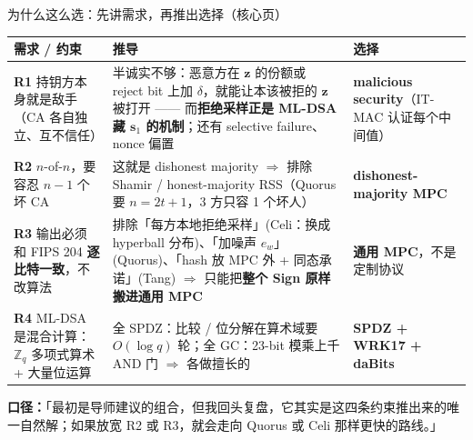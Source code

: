 \documentclass[aspectratio=169,10pt,fontset=none]{ctexbeamer}
\newcommand{\say}[1]{{\color{ok}\textbf{口径：}}#1}
\begin{document}
\begin{frame}{为什么这么选：先讲需求，再推出选择（核心页）}
\renewcommand{\arraystretch}{1.25}
\begin{tabularx}{\textwidth}{@{}p{3.6cm}Y p{3.3cm}@{}}
\toprule
\textbf{需求 / 约束} & \textbf{推导} & \textbf{选择} \\ \midrule
\textbf{R1} 持钥方本身就是敌手（CA 各自独立、互不信任） &
半诚实不够：恶意方在 $\mathbf z$ 的份额或 reject bit 上加 $\delta$，就能让本该被拒的 $\mathbf z$ 被打开 —— 而\textbf{拒绝采样正是 ML-DSA 藏 $\mathbf s_1$ 的机制}；还有 selective failure、nonce 偏置 &
\textbf{malicious security}（IT-MAC 认证每个中间值）\\
\textbf{R2} $n$-of-$n$，要容忍 $n-1$ 个坏 CA &
这就是 dishonest majority $\Rightarrow$ 排除 Shamir / honest-majority RSS（Quorus 要 $n=2t+1$，3 方只容 1 个坏人）&
\textbf{dishonest-majority MPC} \\
\textbf{R3} 输出必须和 FIPS 204 \textbf{逐比特一致}，不改算法 &
排除「每方本地拒绝采样」(Celi：换成 hyperball 分布)、「加噪声 $e_w$」(Quorus)、「hash 放 MPC 外 + 同态承诺」(Tang) $\Rightarrow$ 只能把\textbf{整个 Sign 原样搬进通用 MPC} &
\textbf{通用 MPC}，不是定制协议 \\
\textbf{R4} ML-DSA 是混合计算：$\mathbb Z_q$ 多项式算术 + 大量位运算 &
全 SPDZ：比较 / 位分解在算术域要 $O(\log q)$ 轮；全 GC：23-bit 模乘上千 AND 门 $\Rightarrow$ 各做擅长的 &
\textbf{SPDZ + WRK17 + daBits} \\
\bottomrule
\end{tabularx}
\vspace{.4em}

\say{「最初是导师建议的组合，但我回头复盘，它其实是这四条约束推出来的唯一自然解；如果放宽 R2 或 R3，就会走向 Quorus 或 Celi 那样更快的路线。」}
\end{frame}
\end{document}
